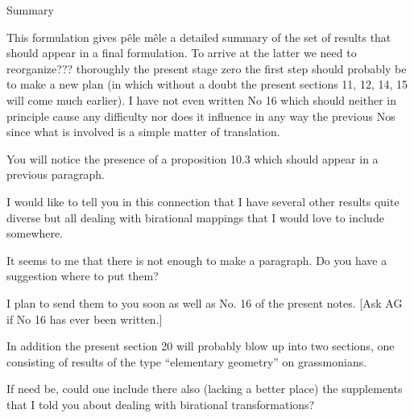 
Summary

This formulation gives pêle mêle a detailed summary of the
set of results that should appear in a final formulation. To
arrive at the latter we need to reorganize??? thoroughly the
present stage zero the first step should probably be to make a new
plan (in which without a doubt the present sections 11, 12, 14, 15
will come much earlier). I have not even written No 16 which
should neither in principle cause any difficulty nor does it
influence in any way the previous Nos since what is involved is a
simple matter of translation.

You will notice the presence of a proposition 10.3 which
should appear in a previous paragraph.

I would like to tell you in this connection that I have
several other results quite diverse but all dealing with
birational mappings that I would love to include somewhere.

It seems to me that there is not enough to make a paragraph.
Do you have a suggestion where to put them?

I plan to send them to you soon as well as No. 16 of the
present notes. [Ask AG if No 16 has ever been written.] \hand{$^{*}$}

In addition the present section 20 will probably blow up into
two sections, one consisting of results of the type ``elementary
geometry'' on grassmonians.

If need be, could one include there also (lacking a better
place) the supplements that I told you about dealing with
birational transformations?

